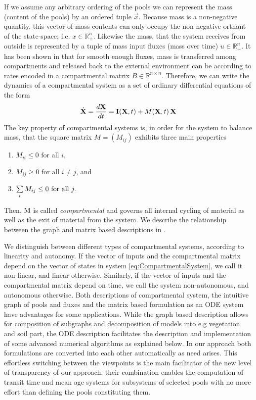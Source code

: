 If we assume any arbitrary ordering of the pools we can represent the mass (content of the pools)
by an ordered tuple $\vec{x}$.
Because mass is a non-negative quantity, this vector of mass contents can
only occupy the non-negative orthant of the state-space; i.e. $x \in
\mathbb{R}^n_+$. 
Likewise the mass, that the system receives from outside is represented
by a tuple of mass input fluxes (mass over time) $u \in \mathbb{R}^n_+$.
It has been shown in \citep{Jacquez1993SIAM}
that for smooth enough fluxes, mass is transferred among compartments and released back to the external
environment can be according to rates encoded in a compartmental matrix $B \in
\mathbb{R}^{n \times n}$. 
Therefore, we can write the dynamics of a
compartmental system as a set of ordinary differential equations of the form
\begin{equation} \label{eq:CompartmentalSystem}
\dot{\mathbf{X}} = \frac{d\mathbf{X}}{dt} = \mathbf{I}(\mathbf{X}, t) + M(\mathbf{X}, t) \, \mathbf{X}
\end{equation}
The key property of compartmental systems is, in order for the system to balance mass, that the square matrix $M=(M_{ij})$ exhibits three main properties
\begin{enumerate}
  \item $M_{ii}\leq0\text{ for all }i$,
  \item $M_{ij}\geq0\text{ for all }i\neq j$, and
  \item $\sum\limits_i M_{ij}\leq 0\text{ for all }j$.
\end{enumerate}
Then, $\mathrm{M}$ is called \emph{compartmental} and governs all internal cycling of material as well as the exit of material from the system.
We describe the relationship between the graph and matrix based descriptions in .

We distinguish between different types of compartmental systems, according to linearity and autonomy. If the vector of inputs and the compartmental matrix depend on the vector of states in system \eqref{eq:CompartmentalSystem}, we call it non-linear, and linear otherwise. Similarly, if the vector of inputs and the compartmental matrix depend on time, we call the system non-autonomous, and autonomous otherwise. 
Both descriptions of compartmental system, the intuitive graph of pools and fluxes and the 
matrix based formulation as an ODE system have advantages for some applications. 
While the graph based description allows for composition of subgraphs and decomposition of models into e.g vegetation and soil part, the ODE description facilitates the description and implementation of some advanced numerical algorithms as explained below.
In our approach both formulations are converted into each other automatically as need arises.
This effortless switching between the viewpoints is the main facilitator of the new level of transparency of our approach, their combination enables the computation of transit time and mean age systems for subsystems of selected pools with no more effort than defining the pools constituting them.

